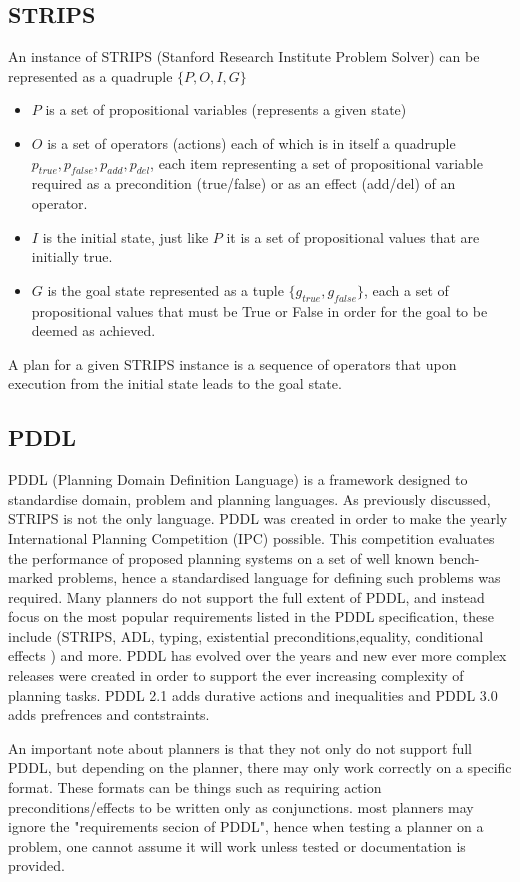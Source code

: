 \subsection{STRIPS}
An instance of STRIPS (Stanford Research Institute Problem Solver) can be represented as a quadruple \(\{P,O,I,G\}\)
\begin{itemize}
  \item \(P\) is a set of propositional variables (represents a given state)
  \item \(O\) is a set of operators (actions) each of which is in itself a quadruple \(p_{true},p_{false},p_{add},p_{del}\), each item representing a set of propositional variable required as a precondition (true/false) or as an effect (add/del) of an operator.
  \item \(I\) is the initial state, just like \(P\) it is a set of propositional values that are initially true.
  \item \(G\) is the goal state represented as a tuple \(\{g_{true},g_{false}\}\), each a set of propositional values that must be True or False in  order for the goal to be deemed as achieved.
\end{itemize}
A plan for a given STRIPS instance is a sequence of operators that upon execution from the initial state leads to the goal state.

\subsection{PDDL}
PDDL  (Planning Domain Definition Language) is a framework designed to standardise domain, problem and planning languages. As previously discussed, STRIPS is not the only language. PDDL was created in order to make the yearly International Planning Competition (IPC) possible. This competition evaluates the performance of proposed planning systems on a set of well known bench-marked problems, hence a standardised language for defining such problems was required. Many planners do not support the full extent of PDDL, and instead focus on the most popular requirements listed in the PDDL specification, these include (STRIPS, ADL, typing, existential preconditions,equality, conditional effects ) and more. PDDL has evolved over the years and new ever more complex releases were created in order to support the ever increasing complexity of planning tasks. PDDL 2.1 adds durative actions and inequalities and PDDL 3.0 adds prefrences and contstraints. 

An important note about planners is that they not only do not support full PDDL, but depending on the planner, there may only work correctly on a specific format. These formats can be things such as requiring action preconditions/effects to be written only as conjunctions. most planners may ignore the "requirements secion of PDDL", hence when testing a planner on a problem, one cannot assume it will work unless tested or documentation is provided.

